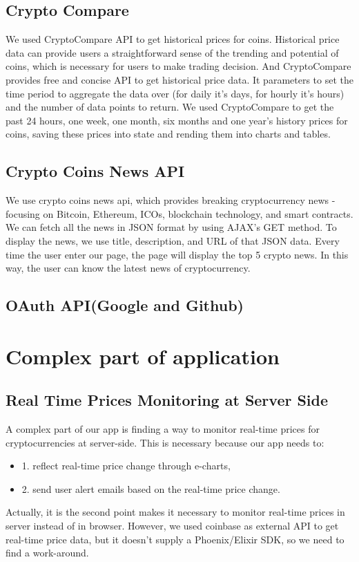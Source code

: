 \subsection{Crypto Compare}
We used CryptoCompare API to get historical prices for coins. 
Historical price data can provide users a straightforward sense 
of the trending and potential of coins, which is necessary for 
users to make trading decision. And CryptoCompare provides free 
and concise API to get historical price data. It parameters to 
set the time period to aggregate the data over (for daily it's 
days, for hourly it's hours) and the number of data points to 
return. We used CryptoCompare to get the past 24 hours, one week, 
one month, six months and one year's history prices for coins, 
saving these prices into state and rending them into charts and tables.
\subsection{Crypto Coins News API}
We use crypto coins news api, which provides breaking cryptocurrency
news - focusing on Bitcoin, Ethereum, ICOs, blockchain technology,
and smart contracts. We can fetch all the news in JSON format by
using AJAX's GET method. To display the news, we use title, description,
and URL of that JSON data. Every time the user enter our page, the 
page will display the top 5 crypto news. In this way, the user 
can know the latest news of cryptocurrency.
\subsection{OAuth API(Google and Github)}



\section{Complex part of application}
\subsection{Real Time Prices Monitoring at Server Side}
A complex part of our app is finding a way to monitor real-time 
prices for cryptocurrencies at server-side. This is necessary 
because our app needs to: 
\begin{itemize}
\item 1. reflect real-time price change 
through e-charts, 
\item 2. send user alert emails based on the 
real-time price change. 
\end{itemize}
Actually, it is the second point 
makes it necessary to monitor real-time prices in server 
instead of in browser. However, we used coinbase as external 
API to get real-time price data, but it doesn't supply a 
Phoenix/Elixir SDK, so we need to find a work-around. 


